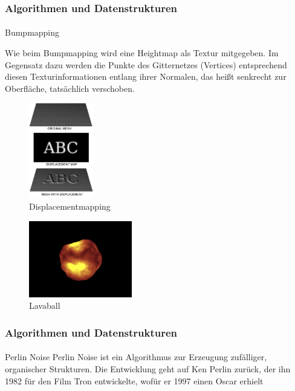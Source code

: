 \documentclass{beamer}
\begin{document}
\begin{frame}
    \frametitle{Algorithmen und Datenstrukturen}
\framesubtitle{}
    \begin{block}{Bumpmapping}


Wie beim Bumpmapping  wird  eine Heightmap als Textur mitgegeben.
Im Gegensatz dazu werden die Punkte des Gitternetzes (Vertices)  entsprechend diesen Texturinformationen entlang ihrer Normalen, 
das heißt senkrecht zur Oberfläche, tatsächlich verschoben. 

\begin{figure}[H]
    \centering
    \includegraphics[width=0.25\textwidth]{images/Displacement.jpg}
    \caption{Displacementmapping} %
    \label{fig:displacement-mapping}
\end{figure}

\begin{figure}[H]
    \centering
    \includegraphics[width=0.4\textwidth]{images/lava.png}
    \caption{Lavaball}
    \label{fig:reflection-phong-specular-model}
\end{figure}
\end{block}

\end{frame}


\begin{frame}
    \frametitle{Algorithmen und Datenstrukturen}
\framesubtitle{}
\begin{block}{Perlin Noise}
Perlin Noise ist ein Algorithmus zur Erzeugung zufälliger, 
organischer Strukturen. 
Die Entwicklung geht auf Ken Perlin zurück, 
der ihn 1982 für den Film Tron entwickelte, 
wofür er 1997 einen Oscar erhielt
\end{block}
\end{frame}
\end{document}
